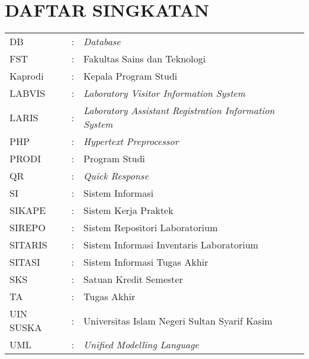 %
%
%
%

\chapter*{DAFTAR SINGKATAN}
\begin{tabular}{lll}
	DB        & : & \textit{Database}                                             \\
	FST       & : & Fakultas Sains dan Teknologi                                  \\
	Kaprodi   & : & Kepala Program Studi                                          \\
	LABVIS    & : & \textit{Laboratory Visitor Information System}                \\
	LARIS     & : & \textit{Laboratory Assistant Registration Information System} \\
	PHP       & : & \textit{Hypertext Preprocessor}                               \\
	PRODI     & : & Program Studi                                                 \\
	QR        & : & \textit{Quick Response}                                       \\
	SI        & : & Sistem Informasi                                              \\
	SIKAPE    & : & Sistem Kerja Praktek                                          \\
	SIREPO    & : & Sistem Repositori Laboratorium                                \\
	SITARIS   & : & Sistem Informasi Inventaris Laboratorium                      \\
	SITASI    & : & Sistem Informasi Tugas Akhir                                  \\
	SKS       & : & Satuan Kredit Semester                                        \\
	TA        & : & Tugas Akhir                                                   \\
	UIN SUSKA & : & Universitas Islam Negeri Sultan Syarif Kasim                  \\
	UML       & : & \textit{Unified Modelling Language}                           \\
\end{tabular}